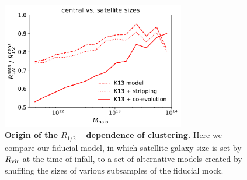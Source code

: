 \documentclass[usenatbib,usegraphicx,letterpaper]{mn2e}
\newcommand{\rhalf}{R_{1/2}}
\newcommand{\mstar}{M_{\ast}}
\newcommand{\mvir}{M_{\rm vir}}
\newcommand{\macc}{M_{\rm acc}}
\newcommand{\rvir}{R_{\rm vir}}
\newcommand{\rproj}{r_{\rm p}}
\newcommand{\wproj}{w_{\rm p}}
\newcommand{\msun}{M_\odot}
\begin{document}


\begin{figure}
\centering
\includegraphics[width=8cm]{FIGS/sat_vs_cen_sizes_fracdiff.pdf}
\caption{
{\bf Origin of the $\rhalf-$dependence of clustering.}
Here we compare our fiducial model, in which satellite galaxy size is set by $\rvir$ at the time of infall, to a set of alternative models created by shuffling the sizes of various subsamples of the fiducial mock. 
}
\label{fig:shuffle}
\end{figure}

\end{document}
